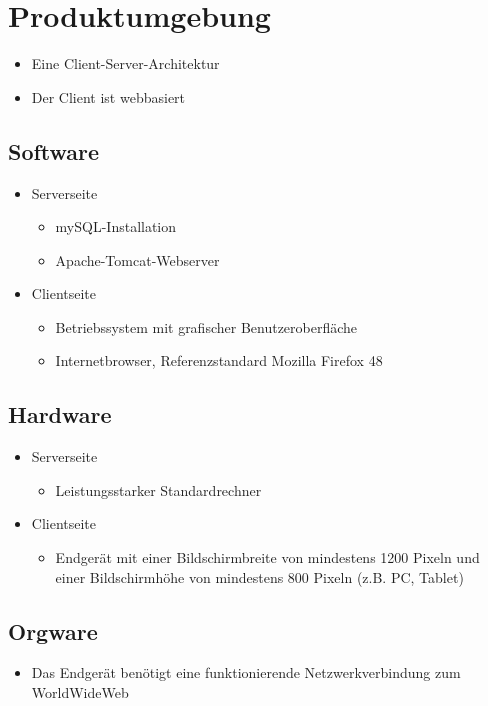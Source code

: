 \section{Produktumgebung}
\begin{itemize}
	\item Eine Client-Server-Architektur
	\item Der Client ist webbasiert
\end{itemize}
\subsection{Software}
\begin{itemize}
	\item Serverseite
	\begin{itemize}
		\item mySQL-Installation
		\item Apache-Tomcat-Webserver
	\end{itemize}
	\item Clientseite
	\begin{itemize}
		\item Betriebssystem mit grafischer Benutzeroberfläche
		\item \gls{Internetbrowser}, Referenzstandard Mozilla Firefox 48
	\end{itemize}
\end{itemize}
\subsection{Hardware}
\begin{itemize}
	\item Serverseite
	\begin{itemize}
		\item Leistungsstarker Standardrechner
	\end{itemize}
	\item Clientseite
	\begin{itemize}
		\item Endgerät mit einer Bildschirmbreite von mindestens 1200 Pixeln und einer Bildschirmhöhe von mindestens 800 Pixeln (z.B. PC, Tablet)
	\end{itemize}
\end{itemize}
\subsection{Orgware}
\begin{itemize}
	\item Das Endgerät benötigt eine funktionierende Netzwerkverbindung zum WorldWideWeb
\end{itemize}